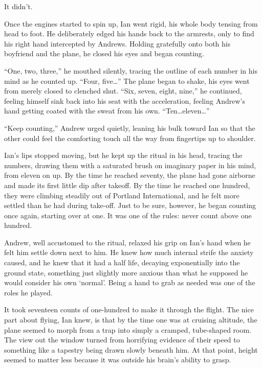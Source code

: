 It didn't.

Once the engines started to spin up, Ian went rigid, his whole body tensing from head to foot. He deliberately edged his hands back to the armrests, only to find his right hand intercepted by Andrews. Holding gratefully onto both his boyfriend and the plane, he closed his eyes and began counting.

``One, two, three,'' he mouthed silently, tracing the outline of each number in his mind as he counted up. ``Four, five\ldots{}'' The plane began to shake, his eyes went from merely closed to clenched shut. ``Six, seven, eight, nine,'' he continued, feeling himself sink back into his seat with the acceleration, feeling Andrew's hand getting coated with the sweat from his own. ``Ten\ldots{}eleven\ldots{}''

``Keep counting,'' Andrew urged quietly, leaning his bulk toward Ian so that the other could feel the comforting touch all the way from fingertips up to shoulder.

Ian's lips stopped moving, but he kept up the ritual in his head, tracing the numbers, drawing them with a saturated brush on imaginary paper in his mind, from eleven on up. By the time he reached seventy, the plane had gone airborne and made its first little dip after takeoff. By the time he reached one hundred, they were climbing steadily out of Portland International, and he felt more settled than he had during take-off. Just to be sure, however, he began counting once again, starting over at one. It was one of the rules: never count above one hundred.

Andrew, well accustomed to the ritual, relaxed his grip on Ian's hand when he felt him settle down next to him. He knew how much internal strife the anxiety caused, and he knew that it had a half life, decaying exponentially into the ground state, something just slightly more anxious than what he supposed he would consider his own `normal'. Being a hand to grab as needed was one of the roles he played.

\secdiv

It took seventeen counts of one-hundred to make it through the flight. The nice part about flying, Ian knew, is that by the time one was at cruising altitude, the plane seemed to morph from a trap into simply a cramped, tube-shaped room. The view out the window turned from horrifying evidence of their speed to something like a tapestry being drawn slowly beneath him. At that point, height seemed to matter less because it was outside his brain's ability to grasp.

